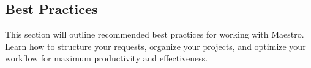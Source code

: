 \subsection*{Best Practices}

This section will outline recommended best practices for working with Maestro. Learn how to structure your requests, organize your projects, and optimize your workflow for maximum productivity and effectiveness.